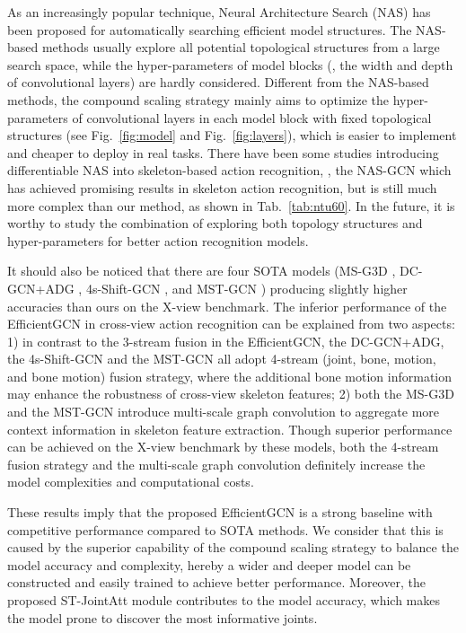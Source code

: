 \documentclass[10pt,journal,compsoc]{IEEEtran}
\begin{document}
As an increasingly popular technique, Neural Architecture Search (NAS) has been proposed for automatically searching efficient model structures. The NAS-based methods usually explore all potential topological structures from a large search space, while the hyper-parameters of model blocks (\eg, the width and depth of convolutional layers) are hardly considered. Different from the NAS-based methods, the compound scaling strategy mainly aims to optimize the hyper-parameters of convolutional layers in each model block with fixed topological structures (see Fig.~\ref{fig:model} and Fig.~\ref{fig:layers}), which is easier to implement and cheaper to deploy in real tasks. There have been some studies introducing differentiable NAS into skeleton-based action recognition, \eg, the NAS-GCN \cite{peng2020learning} which has achieved promising results in skeleton action recognition, but is still much more complex than our method, as shown in Tab.~\ref{tab:ntu60}. In the future, it is worthy to study the combination of exploring both topology structures and hyper-parameters for better action recognition models.

It should also be noticed that there are four SOTA models (MS-G3D \cite{liu2020disentangling}, DC-GCN+ADG \cite{cheng2020decoupling}, 4s-Shift-GCN \cite{cheng2020skeleton}, and MST-GCN \cite{chen2021multi}) producing slightly higher accuracies than ours on the X-view benchmark. The inferior performance of the EfficientGCN in cross-view action recognition can be explained from two aspects: 1) in contrast to the 3-stream fusion in the EfficientGCN, the DC-GCN+ADG, the 4s-Shift-GCN and the MST-GCN all adopt 4-stream (joint, bone, motion, and bone motion) fusion strategy, where the additional bone motion information may enhance the robustness of cross-view skeleton features; 2) both the MS-G3D and the MST-GCN introduce multi-scale graph convolution to aggregate more context information in skeleton feature extraction. Though superior performance can be achieved on the X-view benchmark by these models, both the 4-stream fusion strategy and the multi-scale graph convolution definitely increase the model complexities and computational costs.

These results imply that the proposed EfficientGCN is a strong baseline with competitive performance compared to SOTA methods. We consider that this is caused by the superior capability of the compound scaling strategy to balance the model accuracy and complexity, hereby a wider and deeper model can be constructed and easily trained to achieve better performance. Moreover, the proposed ST-JointAtt module contributes to the model accuracy, which makes the model prone to discover the most informative joints.
\end{document}
